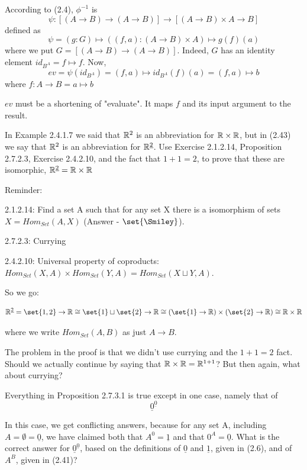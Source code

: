 \documentclass{article}
\begin{document}
\ans

\es According to (2.4),
$\phi^{-1}$ is
\[
\psi : [(A \to B) \to (A \to B)] \to [(A \to B) \times A \to B]
\]
defined as
\[
\psi = (g:G) \mapsto ((f, a): (A \to B)\times A) \mapsto g(f)(a)
\]
where we put $G = [(A \to B) \to (A \to B)]$. Indeed, $G$ has an identity
element $id_{B^A} = f \mapsto f$.
Now, \[ev = \psi(id_{B^A}) = (f,a) \mapsto id_{B^A}(f)(a) = (f,a) \mapsto b\]
where $f: A \to B = a \mapsto b$

\ei $ev$ must be a shortening of "evaluate". It maps $f$ and its input argument
    to the result.

\ee


In Example 2.4.1.7 we said that $\mathbb{R}^2$ is an abbreviation for $\mathbb{R}
\times \mathbb{R}$, but in (2.43) we say that $\mathbb{R}^2$ is an abbreviation
for $\mathbb{R}^{\underline{2}}$. Use Exercise 2.1.2.14, Proposition 2.7.2.3,
Exercise 2.4.2.10, and the fact that $1+1=2$, to prove that these are
isomorphic, $\mathbb{R}^{\underline{2}} = \mathbb{R} \times \mathbb{R}$

\ans

Reminder:

2.1.2.14: Find a set A such that for any set X there is a isomorphism of sets $X
= Hom_{Set}(A,X)$ (Answer - $\set{\Smiley}$).

2.7.2.3: Currying

2.4.2.10: Universal property of coproducts: $Hom_{Set}(X,A) \times
Hom_{Set}(Y,A) = Hom_{Set}(X \sqcup Y, A)$.


So we go:

\[
\Rat^{\underline 2} = \set{1,2} \to \Rat \cong \set{1} \sqcup \set{2} \to
\Rat \cong (\set{1} \to \Rat) \times (\set{2} \to \Rat) \cong \Rat \times \Rat
\]

where we write $Hom_{Set}(A,B)$ as just $A \to B$.

\unsure The problem in the proof is that we didn't use currying and the $1+1=2$
fact. Should we actually continue by saying that $\mathbb{R} \times \mathbb{R} =
\mathbb{R}^{1+1}$? But then again, what about currying?


Everything in Proposition 2.7.3.1 is true except in one case, namely
that of
\[
  \underline{0}^{\underline{0}}
\]

In this case, we get conflicting answers, because for any set A, including $A =
\emptyset = \underline{0}$, we have claimed both that $A^0 = \underline{1}$ and
that $0^A = \underline{0}$.  What is the correct answer for
$\underline{0}^{\underline{0}}$, based on the definitions of $\underline{0}$ and
$\underline{1}$, given in (2.6), and of $A^B$, given in (2.41)?
\end{document}
